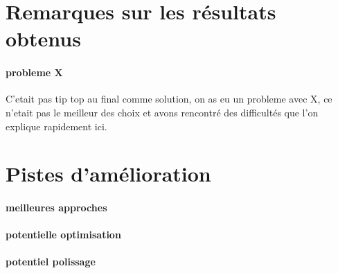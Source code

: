 \documentclass[
	headsepline=on,
	footsepline=on,
	twoside=off,
	abstract=on,
	DIV=10
]{scrreprt}
\begin{document}
			\section{Remarques sur les résultats obtenus}
			
				\paragraph{probleme X}
				C'etait pas tip top au final comme solution, on as eu un probleme avec X, ce n'etait pas le meilleur des choix et avons rencontré des difficultés que l'on explique rapidement ici.
				
			\section{Pistes d'amélioration}
			
				\paragraph{meilleures approches}
				
				\paragraph{potentielle optimisation}
				
				\paragraph{potentiel polissage}
		
		
		
		
		
		
\end{document}
